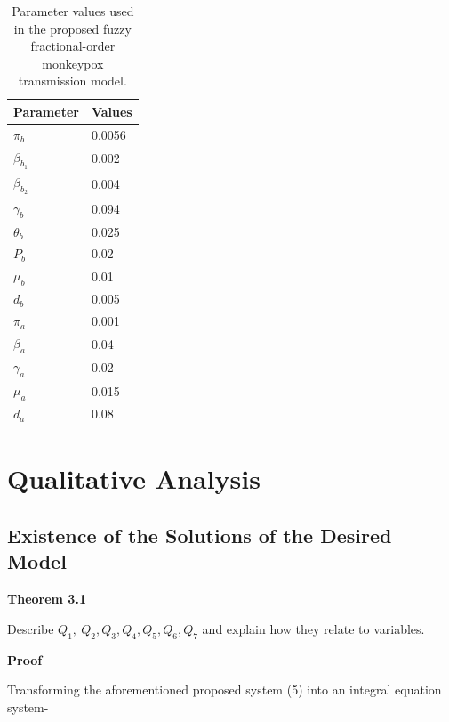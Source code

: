 \documentclass[10pt]{NSP1}
\begin{document}
\begin{table}[htbp]
\begin{center}
\caption{Parameter values used in the proposed fuzzy fractional-order monkeypox transmission model.}
\label{tab1}
\begin{tabular}{|p{180pt}|p{158pt}|}
\hline
Parameter & Values \\
\hline
\(\pi_{b}\) & 0.0056 \\
\hline
\(\beta_{b_{1}}\) & 0.002 \\
\hline
\(\beta_{b_{2}}\) & 0.004 \\
\hline
\(\gamma_{b}\) & 0.094 \\
\hline
\(\theta_{b}\) & 0.025 \\
\hline
\(P_{b}\) & 0.02 \\
\hline
\(\mu_{b}\) & 0.01 \\
\hline
\(d_{b}\) & 0.005 \\
\hline
\(\pi_{a}\) & 0.001 \\
\hline
\(\beta_{a}\) & 0.04 \\
\hline
\(\gamma_{a}\) & 0.02 \\
\hline
\(\mu_{a}\) & 0.015 \\
\hline
\(d_{a}\) & 0.08 \\
\hline
\end{tabular}
\end{center}
\end{table}

\section{Qualitative Analysis}

\subsection{Existence of the Solutions of the Desired Model}

\textbf{Theorem 3.1}

Describe \(Q_{1},\ Q_{2},Q_{3},Q_{4},Q_{5},Q_{6},Q_{7}\) and explain how they relate to variables.

\textbf{Proof}

Transforming the aforementioned proposed system (5) into an integral equation system-
\end{document}
